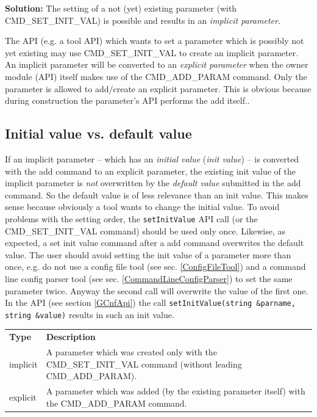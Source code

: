 {\bf Solution:} The setting of a not (yet) existing parameter (with CMD\_SET\_INIT\_VAL) is possible and results in an {\em implicit parameter}.

The API (e.g. a tool API) which wants to set a parameter which is possibly not yet existing may use
CMD\_SET\_INIT\_VAL to create an implicit parameter. An implicit parameter will be converted to an {\em
explicit parameter} when the owner module (API) itself makes use of the CMD\_ADD\_PARAM
command. Only the parameter is allowed to add/create an explicit parameter. This is obvious because during construction the parameter's API performs the add itself..

\subsection{Initial value vs. default value}
\label{ParamInitValue}
If an implicit parameter -- which has an {\em initial value} ({\em init value}) -- is converted with the add command to an explicit parameter, the existing init value of the implicit parameter is {\em not} overwritten by the {\em default value} submitted in the add
command. So the default value is of less relevance than an init value. This makes sense because
obviously a tool wants to change the initial value. To avoid problems with the setting order, the
\lstinline|setInitValue| API call (or the CMD\_SET\_INIT\_VAL command) should be used only once. Likewise, as expected, a set init value command after a add command overwrites the default value. The user should avoid setting the init value of a parameter more than once, e.g. do not use a config file tool (see sec. \ref{ConfigFileTool}) and a command line config parser tool (see sec. \ref{CommandLineConfigParser}) to set the same parameter twice. Anyway the second call will overwrite the value of the first one. In the \GreenConfig API (see section \ref{GCnfApi}) the call \lstinline|setInitValue(string &parname, string &value)| results in such an init value.

\vspace{1 cm}

\noindent
\begin{tabularx}{\textwidth}{|l|X|}
	\cline{1-1}\cline{2-2} {\bf Type}   &  {\bf Description}   \\
	\cline{1-1}\cline{2-2} implicit    &  A parameter which was created only with the CMD\_SET\_INIT\_VAL command (without leading CMD\_ADD\_PARAM).   \\
	\cline{1-1}\cline{2-2} explicit    &  A parameter which was added (by the existing parameter itself) with the CMD\_ADD\_PARAM command.  \\
	\hline
\end{tabularx}

